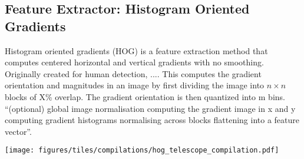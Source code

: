 \documentclass{emulateapj}
\begin{document}
\subsection{Feature Extractor: Histogram Oriented Gradients}\label{sec:hog}
Histogram oriented gradients (HOG) is a feature extraction method that
computes centered horizontal and vertical gradients with no smoothing.
Originally created for human detection, .... This computes the
gradient orientation and magnitudes in an image by first dividing the
image into $n\times n$ blocks of X\% overlap.  The gradient
orientation is then quantized into m bins. ``(optional) global image
normalisation computing the gradient image in x and y computing
gradient histograms normalising across blocks flattening into a
feature vector''\citep{dalalandtriggs_05}.




\begin{figure*}[t]\label{fig:mockimages}
\begin{center}
\texttt{[image: figures/tiles/compilations/hog\_telescope\_compilation.pdf]}
\caption{Left to right show example image transforms of mock images
  from Figure~\ref{fig:mockimages} with a visualized histogram of
  oriented gradients.  The image transform picks up edge features,
  with arc features showing up as edges across radial orientations.}
\end{center}
\end{figure*}
\end{document}
